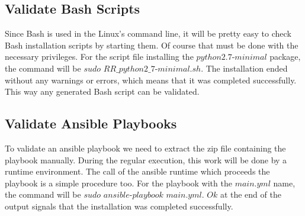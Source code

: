 \subsection*{Validate Bash Scripts}
Since Bash is used in the Linux's command line, it will be pretty easy to check Bash installation scripts by starting them.
Of course that must be done with the necessary privileges.
For the script file installing the $python2.7$-$minimal$ package, the command will be $sudo$ $RR\_python2\_7$-$minimal.sh$.
The installation ended without any warnings or errors, which means that it was completed successfully.
This way any generated Bash script can be validated.

\subsection*{Validate Ansible Playbooks}
To validate an ansible playbook we need to extract the zip file containing the playbook manually. 
During the regular execution, this work will be done by a runtime environment.
The call of the ansible runtime which proceeds the playbook is a simple procedure too.
For the playbook with the $main$.$yml$ name, the command will be $sudo$ $ansible$-$playbook$ $main.yml$.
$Ok$ at the end of the output signals that the installation was completed successfully.
